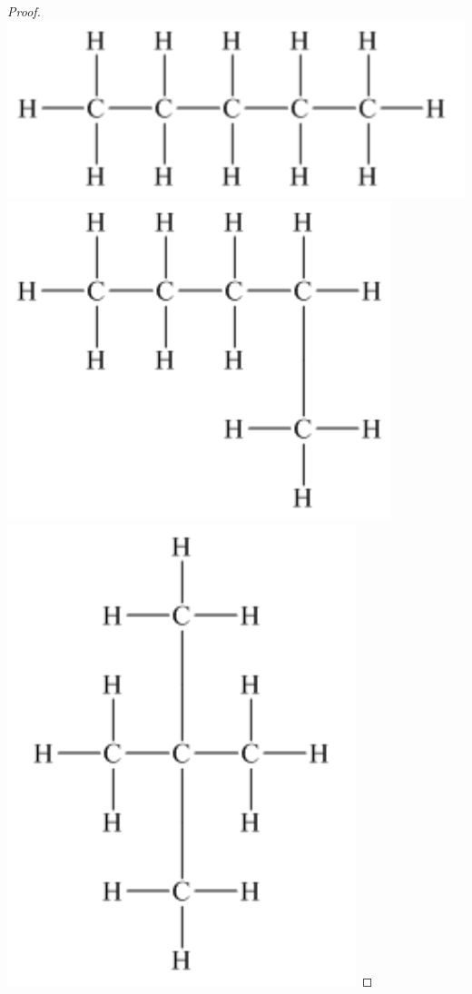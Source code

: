 \documentclass[14pt]{extarticle}
\begin{document}
\begin{proof}
\includegraphics[scale=0.3]{../images/10.4.4.b.1.png}
\includegraphics[scale=0.3]{../images/10.4.4.b.2.png}
\includegraphics[scale=0.3]{../images/10.4.4.b.3.png}
\end{proof}
\end{document}
